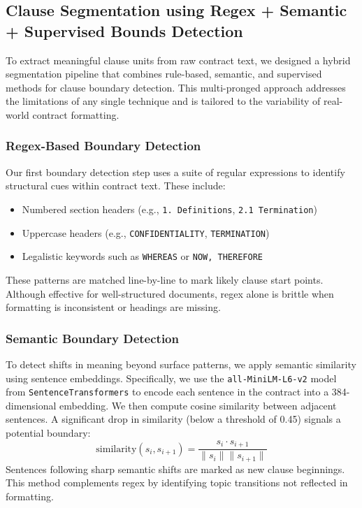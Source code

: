 \documentclass[11pt, oneside]{article}   	%
\begin{document}
\subsection*{Clause Segmentation using Regex + Semantic + Supervised Bounds Detection}

To extract meaningful clause units from raw contract text, we designed a hybrid segmentation pipeline that combines rule-based, semantic, and supervised methods for clause boundary detection. This multi-pronged approach addresses the limitations of any single technique and is tailored to the variability of real-world contract formatting.

\subsubsection*{Regex-Based Boundary Detection}

Our first boundary detection step uses a suite of regular expressions to identify structural cues within contract text. These include:
\begin{itemize}
    \item Numbered section headers (e.g., \texttt{1. Definitions}, \texttt{2.1 Termination})
    \item Uppercase headers (e.g., \texttt{CONFIDENTIALITY}, \texttt{TERMINATION})
    \item Legalistic keywords such as \texttt{WHEREAS} or \texttt{NOW, THEREFORE}
\end{itemize}
These patterns are matched line-by-line to mark likely clause start points. Although effective for well-structured documents, regex alone is brittle when formatting is inconsistent or headings are missing.

\subsubsection*{Semantic Boundary Detection}

To detect shifts in meaning beyond surface patterns, we apply semantic similarity using sentence embeddings. Specifically, we use the \texttt{all-MiniLM-L6-v2} model from \texttt{SentenceTransformers} to encode each sentence in the contract into a 384-dimensional embedding. We then compute cosine similarity between adjacent sentences. A significant drop in similarity (below a threshold of 0.45) signals a potential boundary:
\begin{equation}
\text{similarity}(s_i, s_{i+1}) = \frac{s_i \cdot s_{i+1}}{\|s_i\| \|s_{i+1}\|}
\end{equation}
Sentences following sharp semantic shifts are marked as new clause beginnings. This method complements regex by identifying topic transitions not reflected in formatting.
\end{document}
